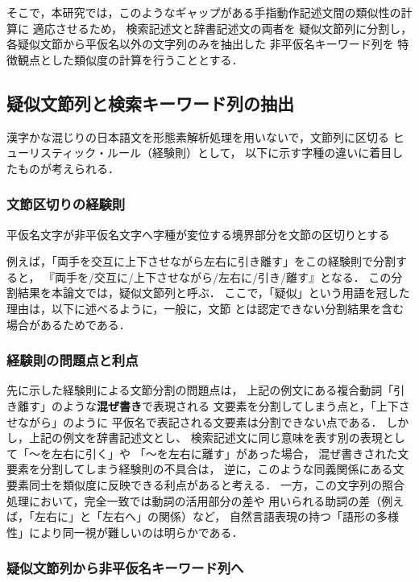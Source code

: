 そこで，本研究では，このようなギャップがある手指動作記述文間の類似性の計算に
適応させるため，
検索記述文と辞書記述文の両者を
疑似文節列に分割し，各疑似文節から平仮名以外の文字列のみを抽出した
非平仮名キーワード列を
特徴観点とした類似度の計算を行うこととする．


\subsection {疑似文節列と検索キーワード列の抽出}

漢字かな混じりの日本語文を形態素解析処理を用いないで，文節列に区切る
ヒューリスティック・ルール（経験則）として，
以下に示す字種の違いに着目したものが考えられる．

\subsubsection {文節区切りの経験則}

\begin{description}
\item 平仮名文字が非平仮名文字へ字種が変位する境界部分を文節の区切りとする
\end{description}

\medskip
例えば，「両手を交互に上下させながら左右に引き離す」をこの経験則で分割すると，
『両手を/交互に/上下させながら/左右に/引き/離す』となる．
この分割結果を本論文では，疑似文節列と呼ぶ．
ここで，「疑似」という用語を冠した理由は，以下に述べるように，一般に，文節
とは認定できない分割結果を含む場合があるためである．

\subsubsection {経験則の問題点と利点}

先に示した経験則による文節分割の問題点は，
上記の例文にある複合動詞「引き離す」のような{\bf 混ぜ書き}で表現される
文要素を分割してしまう点と，「上下させながら」のように
平仮名で表記される文要素は分割できない点である．
しかし，上記の例文を辞書記述文とし、
検索記述文に同じ意味を表す別の表現として「〜を左右に引く」や
「〜を左右に離す」があった場合，
混ぜ書きされた文要素を分割してしまう経験則の不具合は，
逆に，このような同義関係にある文要素同士を類似度に反映できる利点があると考える．
一方，この文字列の照合処理において，完全一致では動詞の活用部分の差や
用いられる助詞の差（例えば，「左右に」と「左右へ」の関係）など，
自然言語表現の持つ「語形の多様性」により同一視が難しいのは明らかである．

\subsubsection {疑似文節列から非平仮名キーワード列へ}

